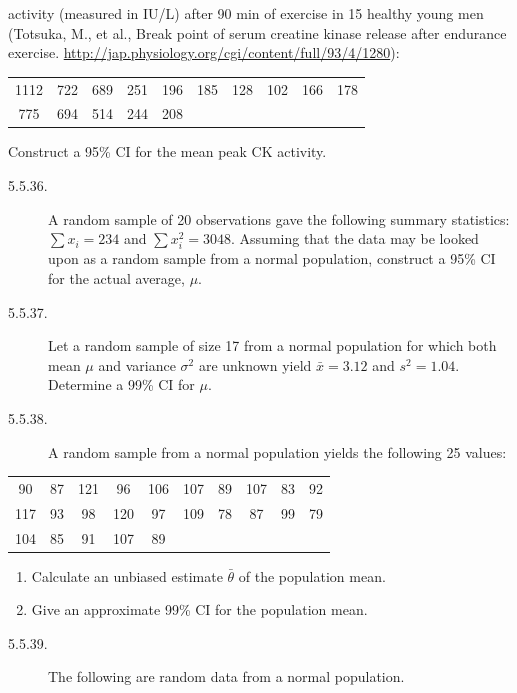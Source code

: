 activity (measured in IU/L) after 90 min of exercise in 15 healthy young men (Totsuka, M., et al., Break point of serum creatine kinase release after endurance exercise. \url{http://jap.physiology.org/cgi/content/full/93/4/1280}):

\begin{center}
\begin{tabular}{cccccccccc}
1112 & 722 & 689 & 251 & 196 & 185 & 128 & 102 & 166 & 178 \\
775 & 694 & 514 & 244 & 208 & & & & &
\end{tabular}
\end{center}

Construct a 95\% CI for the mean peak CK activity.

\begin{description}
\item[5.5.36.] A random sample of 20 observations gave the following summary statistics: $\sum x_i = 234$ and $\sum x_i^2 = 3048$. Assuming that the data may be looked upon as a random sample from a normal population, construct a 95\% CI for the actual average, $\mu$.
\item[5.5.37.] Let a random sample of size 17 from a normal population for which both mean $\mu$ and variance $\sigma^2$ are unknown yield $\bar{x} = 3.12$ and $s^2 = 1.04$. Determine a 99\% CI for $\mu$.
\item[5.5.38.] A random sample from a normal population yields the following 25 values:
\end{description}

\begin{center}
\begin{tabular}{cccccccccc}
90 & 87 & 121 & 96 & 106 & 107 & 89 & 107 & 83 & 92 \\
117 & 93 & 98 & 120 & 97 & 109 & 78 & 87 & 99 & 79 \\
104 & 85 & 91 & 107 & 89 & & & & &
\end{tabular}
\end{center}

\begin{enumerate}
\item[(a)] Calculate an unbiased estimate $\bar{\theta}$ of the population mean.
\item[(b)] Give an approximate 99\% CI for the population mean.
\end{enumerate}

\begin{description}
\item[5.5.39.] The following are random data from a normal population.
\end{description}

